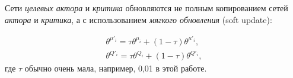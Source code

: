 Сети \textit{целевых актора} и \textit{критика} обновляются не полным копированием сетей \textit{актора} и \textit{критика}, а с использованием \textit{мягкого обновления} (soft update):

\begin{equation}
    \begin{multlined}
        \theta^{\mu'_i} = \tau \theta^{\mu_i} + (1 - \tau)\theta^{\mu'_i},\\
        \theta^{Q'_i} = \tau \theta^{Q_i} + (1 - \tau)\theta^{Q'_i},
    \end{multlined}
\end{equation}
где $\tau$ обычно очень мала, например, 0,01 в этой работе.
